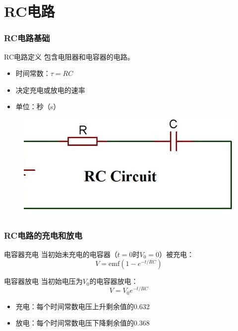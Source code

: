 \documentclass{beamer}
\begin{document}
\section{RC电路}
\begin{frame}
    \frametitle{RC电路基础}
    \begin{block}{RC电路定义}
        包含电阻器和电容器的电路。
    \end{block}
    \begin{itemize}
        \item 时间常数：$\tau = RC$
        \item 决定充电或放电的速率
        \item 单位：秒（s）
    \end{itemize}
    \begin{figure}
        \centering
        \includegraphics[width=0.65\linewidth]{OIP-C.jpg}
    \end{figure}
\end{frame}

\begin{frame}
    \frametitle{RC电路的充电和放电}
    \begin{block}{电容器充电}
        当初始未充电的电容器（$t = 0$时$V_0 = 0$）被充电：
        \[ V = \text{emf}(1-e^{-t/RC}) \]
    \end{block}
    \begin{block}{电容器放电}
        当初始电压为$V_0$的电容器放电：
        \[ V = V_0e^{-t/RC} \]
    \end{block}
    \begin{itemize}
        \item 充电：每个时间常数电压上升剩余值的0.632
        \item 放电：每个时间常数电压下降剩余值的0.368
    \end{itemize}
\end{frame}
\end{document}
